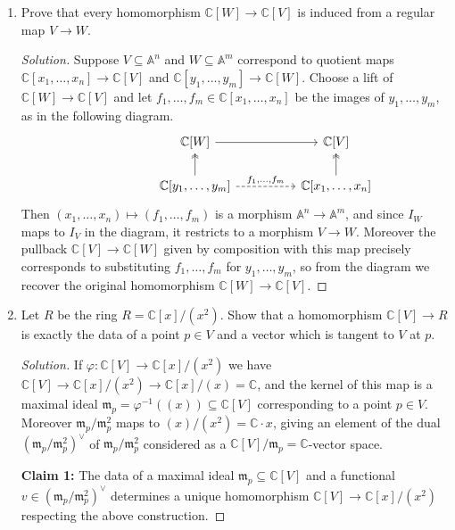 \documentclass{article}
\theoremstyle{definition}
\newcommand{\m}{\mathfrak{m}}
\newcommand{\A}{\mathbb{A}}
\newcommand{\C}{\mathbb{C}}
\begin{document}
\begin{enumerate}
    \item Prove that every homomorphism $\C[W]\to\C[V]$ is induced from a
        regular map $V\to W$.

        \begin{proof}[Solution]
            Suppose $V\subseteq\A^n$ and $W\subseteq\A^m$ correspond to quotient
            maps $\C[x_1,\ldots,x_n]\to\C[V]$ and $\C[y_1,\ldots,y_m]\to\C[W]$.
            Choose a lift of $\C[W]\to\C[V]$ and let
            $f_1,\ldots,f_m\in\C[x_1,\ldots,x_n]$ be the images of
            $y_1,\ldots,y_m$, as in the following diagram.
            \begin{equation*}
                \begin{tikzcd}[column sep=huge]
                    &\C[W] \ar[r] &\C[V] \\
                    &\C[y_1,\ldots,y_m] \ar[u,two heads]
                        \ar[r,dashed,"f_1{,}\ldots{,}f_m"]
                    &\C[x_1,\ldots,x_n] \ar[u,two heads]
                \end{tikzcd}
            \end{equation*}
            Then $(x_1,\ldots,x_n)\mapsto(f_1,\ldots,f_m)$ is a morphism
            $\A^n\to\A^m$, and since $I_W$ maps to $I_V$ in the diagram, it
            restricts to a morphism $V\to W$. Moreover the pullback
            $\C[V]\to\C[W]$ given by composition with this map precisely
            corresponds to substituting $f_1,\ldots,f_m$ for $y_1,\ldots,y_m$,
            so from the diagram we recover the original homomorphism
            $\C[W]\to\C[V]$.
        \end{proof}

    \item Let $R$ be the ring $R=\C[x]/(x^2)$. Show that a homomorphism
        $\C[V]\to R$ is exactly the data of a point $p\in V$ and a vector which
        is tangent to $V$ at $p$.

        \begin{proof}[Solution]
            If $\varphi:\C[V]\to\C[x]/(x^2)$ we have
            $\C[V]\to\C[x]/(x^2)\to\C[x]/(x)=\C$, and the kernel of this map is
            a maximal ideal $\m_p=\varphi^{-1}((x))\subseteq\C[V]$ corresponding
            to a point $p\in V$. Moreover $\m_p/\m_p^2$ maps to
            $(x)/(x^2)=\C\cdot x$, giving an element of the dual
            $(\m_p/\m_p^2)^\vee$ of $\m_p/\m_p^2$ considered as a
            $\C[V]/\m_p=\C$-vector space.

            \textbf{Claim 1:}
            The data of a maximal ideal $\m_p\subseteq\C[V]$ and a functional
            $v\in(\m_p/\m_p^2)^\vee$ determines a unique homomorphism
            $\C[V]\to\C[x]/(x^2)$ respecting the above construction.


\end{proof}
\end{enumerate}
\end{document}
